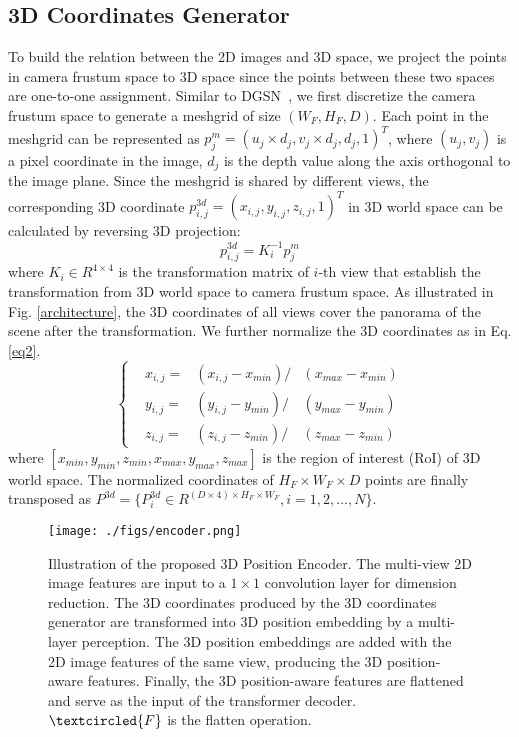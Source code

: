 \documentclass[runningheads]{llncs}
\begin{document}
\subsection{3D Coordinates Generator}
To build the relation between the 2D images and 3D space, we project the points in camera frustum space to 3D space since the points between these two spaces are one-to-one assignment. Similar to DGSN~\cite{chen2020dsgn}, we first discretize the camera frustum space to generate a meshgrid of size $(W_F,H_F,D )$. Each point in the meshgrid can be represented as $p^{m}_j = (u_j\times d_j, v_j\times d_j, d_j, 1)^T$, where $ (u_j, v_j) $ is a pixel coordinate in the image, $d_j$ is the depth value along the axis orthogonal to the image plane. Since the meshgrid is shared by different views, the corresponding 3D coordinate $p^{3d}_{i,j} = (x_{i,j}, y_{i,j}, z_{i,j}, 1)^T$ in 3D world space can be calculated by reversing 3D projection:
\begin{equation}\label{eq1}
p^{3d}_{i,j} = K^{-1}_{i} p^{m}_{j}
\end{equation}
where $K_i\in R^{4 \times 4}$ is the transformation matrix of $i$-th view that establish the transformation from 3D world space to camera frustum space. As illustrated in Fig. \ref{architecture}, the 3D coordinates of all views cover the panorama of the scene after the transformation. We further normalize the 3D coordinates as in Eq. \ref{eq2}.
\begin{equation}\label{eq2}
\left\{
\begin{aligned}
&x_{i,j} = &(x_{i,j}-x_{min}) / &(x_{max}-x_{min})\\
&y_{i,j} = &(y_{i,j}-y_{min}) / &(y_{max}-y_{min})\\
&z_{i,j} = &(z_{i,j}-z_{min}) / &(z_{max}-z_{min})
\end{aligned}
\right.
\end{equation}
where $[x_{min},y_{min},z_{min},x_{max},y_{max},z_{max}]$ is the region of interest (RoI) of 3D world space. The normalized coordinates of $H_F \times W_F \times D$ points are finally transposed as $P^{3d}=\{ P^{3d}_i \in R^{(D\times4) \times H_F\times W_F }, i=1,2,\dots, N \}$.

\begin{figure*}[t]
	\centering  
	\texttt{[image: ./figs/encoder.png]}  
	\caption{Illustration of the proposed 3D Position Encoder. The multi-view 2D image features are input to a $1\times1$ convolution layer for dimension reduction. The 3D coordinates produced by the 3D coordinates generator are transformed into 3D position embedding by a multi-layer perception. The 3D position embeddings are added with the 2D image features of the same view, producing the 3D position-aware features. Finally, the 3D position-aware features are flattened and serve as the input of the transformer decoder.   $\textcircled{\scriptsize F}$ is the flatten operation.}  
	\label{fig2}
\end{figure*}
\end{document}
